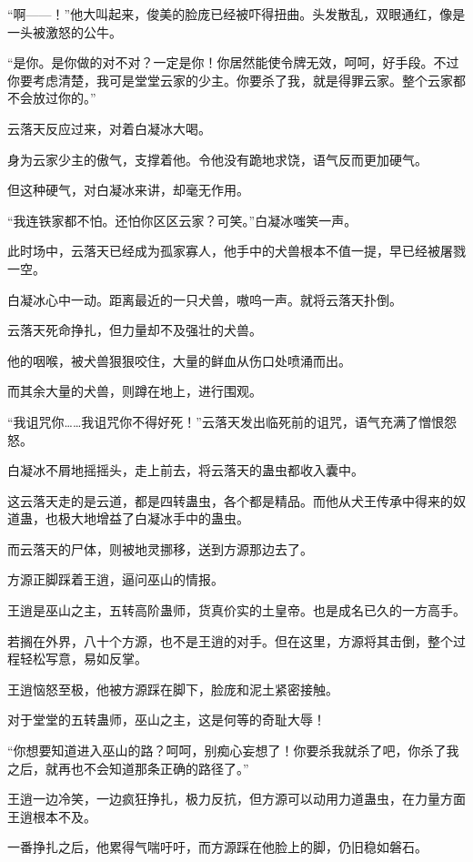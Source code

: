 \begin{this_body}
“啊——！”他大叫起来，俊美的脸庞已经被吓得扭曲。头发散乱，双眼通红，像是一头被激怒的公牛。

“是你。是你做的对不对？一定是你！你居然能使令牌无效，呵呵，好手段。不过你要考虑清楚，我可是堂堂云家的少主。你要杀了我，就是得罪云家。整个云家都不会放过你的。”

云落天反应过来，对着白凝冰大喝。

身为云家少主的傲气，支撑着他。令他没有跪地求饶，语气反而更加硬气。

但这种硬气，对白凝冰来讲，却毫无作用。

“我连铁家都不怕。还怕你区区云家？可笑。”白凝冰嗤笑一声。

此时场中，云落天已经成为孤家寡人，他手中的犬兽根本不值一提，早已经被屠戮一空。

白凝冰心中一动。距离最近的一只犬兽，嗷呜一声。就将云落天扑倒。

云落天死命挣扎，但力量却不及强壮的犬兽。

他的咽喉，被犬兽狠狠咬住，大量的鲜血从伤口处喷涌而出。

而其余大量的犬兽，则蹲在地上，进行围观。

“我诅咒你……我诅咒你不得好死！”云落天发出临死前的诅咒，语气充满了憎恨怨怒。

白凝冰不屑地摇摇头，走上前去，将云落天的蛊虫都收入囊中。

这云落天走的是云道，都是四转蛊虫，各个都是精品。而他从犬王传承中得来的奴道蛊，也极大地增益了白凝冰手中的蛊虫。

而云落天的尸体，则被地灵挪移，送到方源那边去了。

方源正脚踩着王逍，逼问巫山的情报。

王逍是巫山之主，五转高阶蛊师，货真价实的土皇帝。也是成名已久的一方高手。

若搁在外界，八十个方源，也不是王逍的对手。但在这里，方源将其击倒，整个过程轻松写意，易如反掌。

王逍恼怒至极，他被方源踩在脚下，脸庞和泥土紧密接触。

对于堂堂的五转蛊师，巫山之主，这是何等的奇耻大辱！

“你想要知道进入巫山的路？呵呵，别痴心妄想了！你要杀我就杀了吧，你杀了我之后，就再也不会知道那条正确的路径了。”

王逍一边冷笑，一边疯狂挣扎，极力反抗，但方源可以动用力道蛊虫，在力量方面王逍根本不及。

一番挣扎之后，他累得气喘吁吁，而方源踩在他脸上的脚，仍旧稳如磐石。


\end{this_body}
